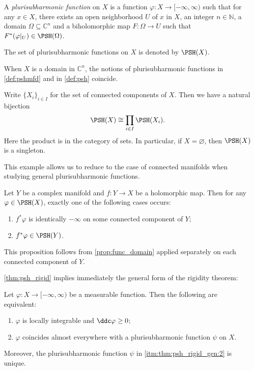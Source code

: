 \begin{definition}\label{def:pshmfd}
    A \emph{plurisubharmonic function} on $X$ is a function $\varphi\colon X\rightarrow [-\infty,\infty)$ such that for any $x\in X$, there exists an open neighborhood $U$ of $x$ in $X$, an integer $n\in \mathbb{N}$, a domain $\Omega\subseteq \mathbb{C}^n$ and a biholomorphic map $F\colon \Omega\rightarrow U$ such that $F^*(\varphi|_U)\in \PSH(\Omega)$.

    The set of plurisubharmonic functions on $X$ is denoted by $\PSH(X)$.
\end{definition}

\begin{example}\label{ex:pshfunctions:L172}
    When $X$ is a domain in $\mathbb{C}^n$, the notions of plurisubharmonic functions in \cref{def:pshmfd} and in \cref{def:psh} coincide.
\end{example}

\begin{example}\label{ex:pshfunctions:L176}
    Write $\{X_i\}_{i\in I}$ for the set of connected components of $X$. Then we have a natural bijection
    \[
    \PSH(X) \cong \prod_{i\in I} \PSH(X_i).
    \]
    Here the product is in the category of sets.
    In particular, if $X=\varnothing$, then $\PSH(X)$ is a singleton.
\end{example}
This example allows us to reduce to the case of connected manifolds when studying general plurisubharmonic functions.

\begin{proposition}\label{prop:pullbackpsh}
    Let $Y$ be a complex manifold and $f\colon Y\rightarrow X$ be a holomorphic map. Then for any $\varphi\in \PSH(X)$, exactly one of the following cases occurs:
    \begin{enumerate}
        \item\label{itm:prop:pullbackpsh:1} $f^*\varphi$ is identically $-\infty$ on some connected component of $Y$;
        \item\label{itm:prop:pullbackpsh:2} $f^*\varphi\in \PSH(Y)$.
    \end{enumerate}
\end{proposition}
This proposition follows from \cref{prop:func_domain} applied separately on each connected component of $Y$.

\cref{thm:psh_rigid} implies immediately the general form of the rigidity theorem:
\begin{theorem}\label{thm:psh_rigid_gen}
    Let $\varphi\colon X\rightarrow [-\infty,\infty)$ be a measurable function. Then the following are equivalent:
    \begin{enumerate}
        \item\label{itm:thm:psh_rigid_gen:1} $\varphi$ is locally integrable and $\ddc \varphi\geq 0$;
        \item\label{itm:thm:psh_rigid_gen:2} $\varphi$ coincides almost everywhere with a plurisubharmonic function $\psi$ on $X$.
    \end{enumerate}
    Moreover, the plurisubharmonic function $\psi$ in \ref{itm:thm:psh_rigid_gen:2} is unique.
\end{theorem}


